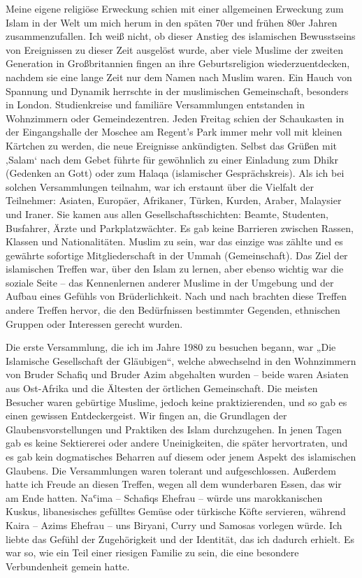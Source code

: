\documentclass[12pt]{memoir}
\def\`{ʿ} %
\begin{document}
Meine eigene religiöse Erweckung schien
mit einer allgemeinen Erweckung zum Islam in der Welt um mich herum
in den späten 70er und frühen 80er Jahren zusammenzufallen.
Ich weiß nicht, ob dieser Anstieg des islamischen Bewusstseins
von Ereignissen zu dieser Zeit ausgelöst wurde,
aber viele Muslime der zweiten Generation in Großbritannien fingen an
ihre Geburtsreligion wiederzuentdecken,
nachdem sie eine lange Zeit nur dem Namen nach Muslim waren.
Ein Hauch von Spannung und Dynamik herrschte
in der muslimischen Gemeinschaft, besonders in London.
Studienkreise und familiäre Versammlungen entstanden
in Wohnzimmern oder Gemeindezentren.
Jeden Freitag schien der Schaukasten in der Eingangshalle
der Moschee am Regent’s Park immer mehr voll mit kleinen Kärtchen zu werden,
die neue Ereignisse ankündigten.
Selbst das Grüßen mit ‚Salam‘ nach dem Gebet führte für gewöhnlich
zu einer Einladung zum Dhikr (Gedenken an Gott)
oder zum Halaqa (islamischer Gesprächskreis).
Als ich bei solchen Versammlungen teilnahm,
war ich erstaunt über die Vielfalt der Teilnehmer:
Asiaten, Europäer, Afrikaner, Türken, Kurden, Araber, Malaysier und Iraner.
Sie kamen aus allen Gesellschaftsschichten:
Beamte, Studenten, Busfahrer, Ärzte und Parkplatzwächter.
Es gab keine Barrieren zwischen Rassen, Klassen und Nationalitäten.
Muslim zu sein, war das einzige was zählte und es gewährte
sofortige Mitgliederschaft in der Ummah (Gemeinschaft).
Das Ziel der islamischen Treffen war, über den Islam zu lernen,
aber ebenso wichtig war die soziale Seite –
das Kennenlernen anderer Muslime in der Umgebung
und der Aufbau eines Gefühls von Brüderlichkeit.
Nach und nach brachten diese Treffen andere Treffen hervor,
die den Bedürfnissen bestimmter Gegenden,
ethnischen Gruppen oder Interessen gerecht wurden.

Die erste Versammlung, die ich im Jahre 1980 zu besuchen begann,
war „Die Islamische Gesellschaft der Gläubigen“,
welche abwechselnd in den Wohnzimmern von Bruder Schafiq und Bruder Azim
abgehalten wurden – beide waren Asiaten aus Ost-Afrika
und die Ältesten der örtlichen Gemeinschaft.
Die meisten Besucher waren gebürtige Muslime, jedoch keine praktizierenden,
und so gab es einen gewissen Entdeckergeist.
Wir fingen an, die Grundlagen der Glaubensvorstellungen
und Praktiken des Islam durchzugehen.
In jenen Tagen gab es keine Sektiererei oder andere Uneinigkeiten,
die später hervortraten, und es gab kein dogmatisches Beharren
auf diesem oder jenem Aspekt des islamischen Glaubens.
Die Versammlungen waren tolerant und aufgeschlossen.
Außerdem hatte ich Freude an diesen Treffen, wegen all dem wunderbaren Essen,
das wir am Ende hatten. Na\`ima – Schafiqs Ehefrau –
würde uns marokkanischen Kuskus, libanesisches gefülltes Gemüse
oder türkische Köfte servieren, während Kaira – Azims Ehefrau –
uns Biryani, Curry und Samosas vorlegen würde.
Ich liebte das Gefühl der Zugehörigkeit und der Identität,
das ich dadurch erhielt.
Es war so, wie ein Teil einer riesigen Familie zu sein,
die eine besondere Verbundenheit gemein hatte.
\end{document}
